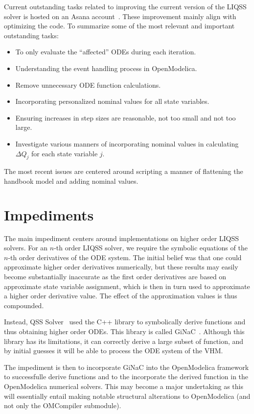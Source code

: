 \documentclass[10pt]{article}
\begin{document}
Current outstanding tasks related to improving the current version of the LIQSS solver is hosted on an Asana account~\cite{asana}. These improvement mainly align with optimizing the code. To summarize some of the most relevant and important outstanding tasks:
\begin{itemize}
 \item To only evaluate the ``affected'' ODEs during each iteration.
 \item Understanding the event handling process in OpenModelica.
 \item Remove unnecessary ODE function calculations.
 \item Incorporating personalized nominal values for all state variables.
 \item Ensuring increases in step sizes are reasonable, not too small and not too large.
 \item Investigate various manners of incorporating nominal values in calculating $\Delta Q_j$ for each state variable $j$.
\end{itemize}

The most recent issues are centered around scripting a manner of flattening the handbook model and adding nominal values.

\section{Impediments}

The main impediment centers around implementations on higher order LIQSS solvers. For an $n$-th order LIQSS solver, we require the symbolic equations of the $n$-th order derivatives of the ODE system. The initial belief was that one could approximate higher order derivatives numerically, but these results may easily become substantially inaccurate as the first order derivatives are based on approximate state variable assignment, which is then in turn used to approximate a higher order derivative value. The effect of the approximation values is thus compounded.

Instead, QSS Solver~\cite{qss} used the {\sf C++} library to symbolically derive functions and thus obtaining higher order ODEs. This library is called {\sf GiNaC}~\cite{ginac}. Although this library has its limitations, it can correctly derive a large subset of function, and by initial guesses it will be able to process the ODE system of the VHM.

The impediment is then to incorporate {\sf GiNaC} into the OpenModelica framework to successfulle derive functions and to the incorporate the derived function in the OpenModelica numerical solvers. This may become a major undertaking as this will essentially entail making notable structural alterations to OpenModelica (and not only the OMCompiler submodule).
\end{document}
